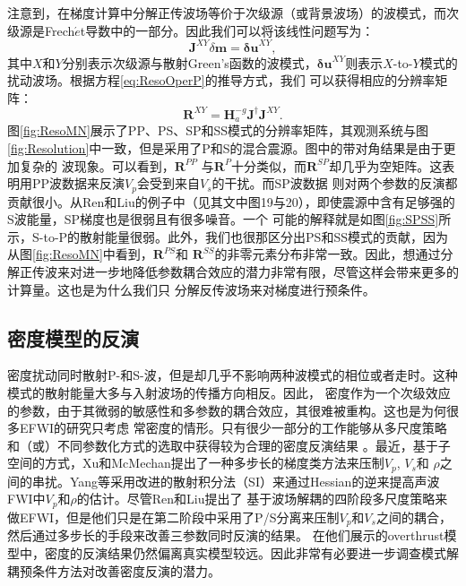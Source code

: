 注意到，在梯度计算中分解正传波场等价于次级源（或背景波场）的波模式，而次级源是Frech{$\acute{e}$}t导数中的一部分。因此我们可以将该线性问题写为：
\begin{equation}
    \mathbf{J}^{XY}\delta\mathbf{m}=\mathbf{\delta u}^{XY},
    \label{eq:JXY}
\end{equation}
其中$X$和$Y$分别表示次级源与散射Green's函数的波模式，$\mathbf{\delta u}^{XY}$则表示${X}$-to-${Y}$模式的扰动波场。根据方程\eqref{eq:ResoOperP}的推导方式，我们
可以获得相应的分辨率矩阵：
\begin{equation}
    \mathbf{R}^{XY}=\mathbf{H}_a^{-g}\mathbf{J}^{\dagger}\mathbf{J}^{XY}. 
    \label{eq:RXY}  
\end{equation}
图\ref{fig:ResoMN}展示了PP、PS、SP和SS模式的分辨率矩阵，其观测系统与图\ref{fig:Resolution}中一致，但是采用了P和S的混合震源。图中的带对角结果是由于更加复杂的
波现象。可以看到，$\mathbf{R}^{PP}$ 与$\mathbf{R}^P$十分类似，而$\mathbf{R}^{SP}$却几乎为空矩阵。这表明用PP波数据来反演$V_p$会受到来自$V_s$的干扰。而SP波数据
则对两个参数的反演都贡献很小。从Ren和Liu\cite{ren.liu:2016}的例子中（见其文中图19与20），即使震源中含有足够强的S波能量，SP梯度也是很弱且有很多噪音。一个
可能的解释就是如图\ref{fig:SPSS}所示，S-to-P的散射能量很弱。此外，我们也很那区分出PS和SS模式的贡献，因为从图\ref{fig:ResoMN}中看到，$\mathbf{R}^{PS}$和
$\mathbf{R}^{SS}$的非零元素分布非常一致。因此，想通过分解正传波来对进一步地降低参数耦合效应的潜力非常有限，尽管这样会带来更多的计算量。这也是为什么我们只
分解反传波场来对梯度进行预条件。
\subsection{密度模型的反演}
密度扰动同时散射P-和S-波，但是却几乎不影响两种波模式的相位或者走时。这种模式的散射能量大多与入射波场的传播方向相反\cite[]{wu.aki:1985,tarantola:1986}。因此，
密度作为一个次级效应的参数，由于其微弱的敏感性和多参数的耦合效应\cite[]{tarantola:1986,forgues.lambare:1997}，其很难被重构。这也是为何很多EFWI的研究只考虑
常密度的情形\cite[]{shipp:2002,sears:2008,brossier2009}。只有很少一部分的工作能够从多尺度策略和（或）不同参数化方式的选取中获得较为合理的密度反演结果
\cite{jeong2012full}。最近，基于子空间的方式\cite[]{kennett:1988}，Xu和McMechan\cite{xu.mcmechan:2014}提出了一种多步长的梯度类方法来压制$V_p$, $V_s$和
$\rho$之间的串扰。Yang等\cite{yang:2016}采用改进的散射积分法（SI）来通过Hessian的逆来提高声波FWI中$V_p$和$\rho$的估计。尽管Ren和Liu\cite{ren.liu:2016}提出了
基于波场解耦的四阶段多尺度策略来做EFWI，但是他们只是在第二阶段中采用了P/S分离来压制$V_p$和$V_s$之间的耦合，然后通过多步长的手段来改善三参数同时反演的结果。
在他们展示的overthrust模型中，密度的反演结果仍然偏离真实模型较远。因此非常有必要进一步调查模式解耦预条件方法对改善密度反演的潜力。

